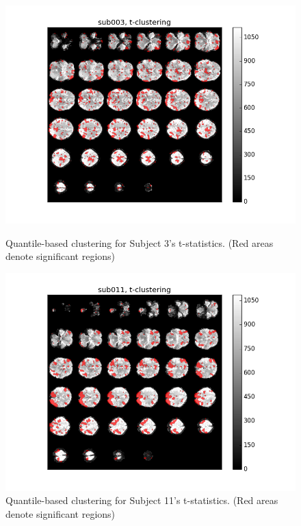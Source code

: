 \begin{figure}[H]
\centering
\begin{minipage}[b]{.66\linewidth}
	\centering
	\includegraphics[width=.8\linewidth]{../images/sub003_t_overlay.png} 
	\caption{Quantile-based clustering for Subject 3's t-statistics. 
	(Red areas denote significant regions)}
	\label{fig:clustersub3}
\end{minipage}	

\begin{minipage}[b]{.66\linewidth}
	\centering
		\includegraphics[width=.8\linewidth]{../images/sub011_t_overlay.png} 
	\caption{Quantile-based clustering for Subject 11's t-statistics. 
	(Red areas denote significant regions)}
	\label{fig:clustersub11}
\end{minipage}


\end{figure}
